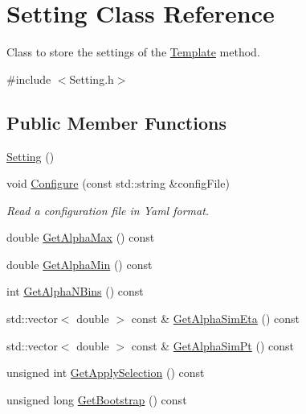 \hypertarget{classTemplateMethod_1_1Setting}{\section{Setting Class Reference}
\label{classTemplateMethod_1_1Setting}
}


Class to store the settings of the \hyperlink{classTemplateMethod_1_1Template}{Template} method.  




{\ttfamily \#include $<$Setting.\+h$>$}

\subsection*{Public Member Functions}
\begin{DoxyCompactItemize}
\item 
\hyperlink{classTemplateMethod_1_1Setting_a86722af0ef038db58d9ec1aa10fbb254}{Setting} ()
\item 
void \hyperlink{classTemplateMethod_1_1Setting_a4b28b338179a078008e9557d1db2424f}{Configure} (const std\+::string \&config\+File)
\begin{DoxyCompactList}\small\item\em Read a configuration file in Yaml format. \end{DoxyCompactList}\item 
double \hyperlink{classTemplateMethod_1_1Setting_a7a1e96c392605a4fe2f8e9ad1b59969c}{Get\+Alpha\+Max} () const 
\item 
double \hyperlink{classTemplateMethod_1_1Setting_aef987d6cf3240d1cf352e6681653fa1e}{Get\+Alpha\+Min} () const 
\item 
int \hyperlink{classTemplateMethod_1_1Setting_a81b26ad0f0ced4e73408881067fbfc92}{Get\+Alpha\+N\+Bins} () const 
\item 
std\+::vector$<$ double $>$ const \& \hyperlink{classTemplateMethod_1_1Setting_a132c12f434d84df4a87ae926edd2a432}{Get\+Alpha\+Sim\+Eta} () const 
\item 
std\+::vector$<$ double $>$ const \& \hyperlink{classTemplateMethod_1_1Setting_a2762693e00455b06c485133e6443ddf3}{Get\+Alpha\+Sim\+Pt} () const 
\item 
unsigned int \hyperlink{classTemplateMethod_1_1Setting_a221f41cb3d7daeb10367135778e8857a}{Get\+Apply\+Selection} () const 
\item 
unsigned long \hyperlink{classTemplateMethod_1_1Setting_ad0f02cefd37220fc427e073f89907031}{Get\+Bootstrap} () const 

\end{DoxyCompactItemize}
